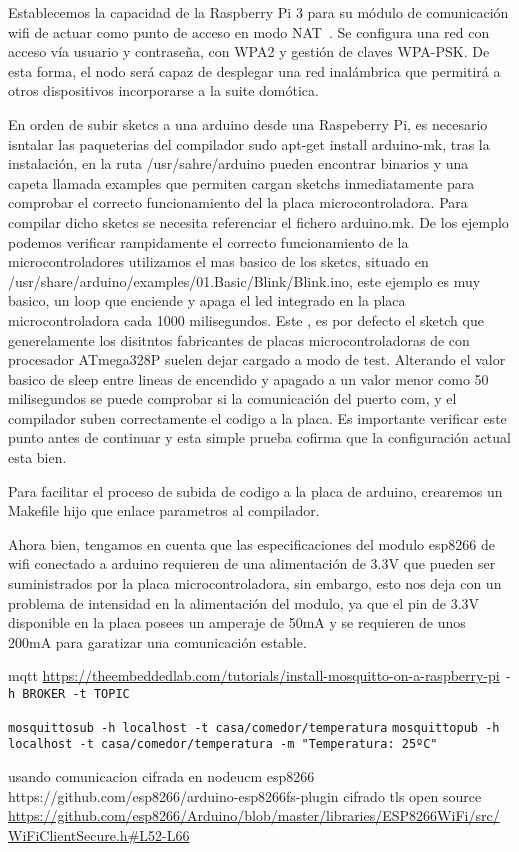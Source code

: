 Establecemos la capacidad de la Raspberry Pi 3 para su módulo de comunicación wifi de actuar como punto de acceso en modo NAT~\cite{raspberrypiasaccesspoint}. Se configura una red con acceso vía usuario y contraseña, con WPA2 y gestión de claves WPA-PSK. De esta forma, el nodo será capaz de desplegar una red inalámbrica que permitirá a otros dispositivos incorporarse a la suite domótica.

En orden de subir sketcs a una arduino desde una Raspeberry Pi, es necesario isntalar las paqueterias del compilador sudo apt-get install arduino-mk, tras la instalación, en la ruta /usr/sahre/arduino pueden encontrar binarios y una capeta llamada examples que permiten cargan sketchs inmediatamente para comprobar el correcto funcionamiento del la placa microcontroladora. Para compilar dicho sketcs se necesita referenciar el fichero arduino.mk. De los ejemplo podemos verificar rampidamente el correcto funcionamiento de la microcontroladores utilizamos el mas basico de los sketcs, situado en /usr/share/arduino/examples/01.Basic/Blink/Blink.ino, este ejemplo es muy basico, un loop que enciende y apaga el led integrado en la placa microcontroladora cada 1000 milisegundos. Este , es por defecto el sketch que generelamente los disitntos fabricantes de placas microcontroladoras de con procesador ATmega328P suelen dejar cargado a modo de test. Alterando el valor basico de sleep entre lineas de encendido y apagado a un valor menor como 50 milisegundos se puede comprobar si la comunicación del puerto com, y el compilador suben correctamente el codigo a la placa. Es importante verificar este punto antes de continuar y esta simple prueba cofirma que la configuración actual esta bien.

Para facilitar el proceso de subida de codigo a la placa de arduino, crearemos un Makefile hijo que enlace parametros al compilador.


Ahora bien, tengamos en cuenta que las especificaciones del modulo esp8266 de wifi conectado a arduino requieren de una alimentación de 3.3V que pueden ser suministrados por la placa microcontroladora, sin embargo, esto nos deja con un problema de intensidad en la alimentación del modulo, ya que el pin de 3.3V disponible en la placa posees un amperaje de 50mA y se requieren de unos 200mA para garatizar una comunicación estable.


mqtt
\url{https://theembeddedlab.com/tutorials/install-mosquitto-on-a-raspberry-pi}
\verb|-h BROKER -t TOPIC|

\verb|mosquittosub -h localhost -t casa/comedor/temperatura|
\verb|mosquittopub -h localhost -t casa/comedor/temperatura -m "Temperatura: 25ºC"|


usando comunicacion cifrada en nodeucm esp8266
https://github.com/esp8266/arduino-esp8266fs-plugin
cifrado tls open source
\url{https://github.com/esp8266/Arduino/blob/master/libraries/ESP8266WiFi/src/WiFiClientSecure.h#L52-L66}
